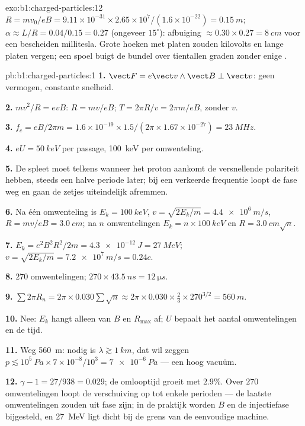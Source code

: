 \begin{solution}{exo:b1:charged-particles:12}
$R = mv_0/eB = 9.11\times10^{-31} \times 2.65\times10^7/(1.6\times10^{-22}) =
\qty{0.15}{m}$; $\alpha \approx L/R = 0.04/0.15 = 0.27$ (ongeveer $15^\circ$):
afbuiging $\approx 0.30 \times 0.27 = \qty{8}{cm}$ voor een bescheiden
millitesla. Grote hoeken met platen zouden kilovolts en lange platen
vergen; een spoel buigt de bundel over tientallen graden zonder enige
.
\end{solution}

\begin{solution}{pb:b1:charged-particles:1}
\textbf{1.} $\vect F = e\vect v\wedge\vect B \perp \vect v$: geen vermogen, constante
snelheid.

\textbf{2.} $mv^2/R = evB$: $R = mv/eB$; $T = 2\pi R/v = 2\pi m/eB$, zonder
$v$.

\textbf{3.} $f_c = eB/2\pi m = 1.6\times10^{-19} \times 1.5/(2\pi \times 1.67
\times10^{-27}) = \qty{23}{MHz}$.

\textbf{4.} $eU = \qty{50}{keV}$ per passage, \qty{100}{keV} per omwenteling.

\textbf{5.} De spleet moet telkens wanneer het proton aankomt de versnellende
polariteit hebben, steeds een halve periode later; bij een verkeerde frequentie
loopt de fase weg en gaan de zetjes uiteindelijk afremmen.

\textbf{6.} Na één omwenteling is $E_k = \qty{100}{keV}$, $v = \sqrt{2E_k/m} =
\qty{4.4e6}{m/s}$, $R = mv/eB = \qty{3.0}{cm}$; na $n$ omwentelingen $E_k =
n \times \qty{100}{keV}$ en $R = \qty{3.0}{cm}\sqrt n$.

\textbf{7.} $E_k = e^2B^2R^2/2m = \qty{4.3e-12}{J} = \qty{27}{MeV}$; $v =
\sqrt{2E_k/m} = \qty{7.2e7}{m/s} = 0.24c$.

\textbf{8.} $270$ omwentelingen; $270 \times \qty{43.5}{ns} = \qty{12}{\micro s}$.

\textbf{9.} $\sum 2\pi R_n = 2\pi \times 0.030\sum\sqrt n \approx 2\pi \times 0.030
\times \tfrac23 \times 270^{3/2} = \qty{560}{m}$.

\textbf{10.} Nee: $E_k$ hangt alleen van $B$ en $R_{\max}$ af; $U$ bepaalt het
aantal omwentelingen en de tijd.

\textbf{11.} Weg \qty{560}{m}: nodig is $\lambda \gtrsim \qty{1}{km}$, dat wil zeggen
$p \lesssim 10^5\ \unit{Pa} \times 7\times10^{-8}/10^3 = \qty{7e-6}{Pa}$ ---
een hoog vacuüm.

\textbf{12.} $\gamma - 1 = 27/938 = 0.029$; de omlooptijd groeit met $2.9\%$.
Over $270$ omwentelingen loopt de verschuiving op tot enkele perioden --- de laatste
omwentelingen zouden uit fase zijn; in de praktijk worden $B$ en de injectiefase
bijgesteld, en \qty{27}{MeV} ligt dicht bij de grens van de eenvoudige machine.


\end{solution}

